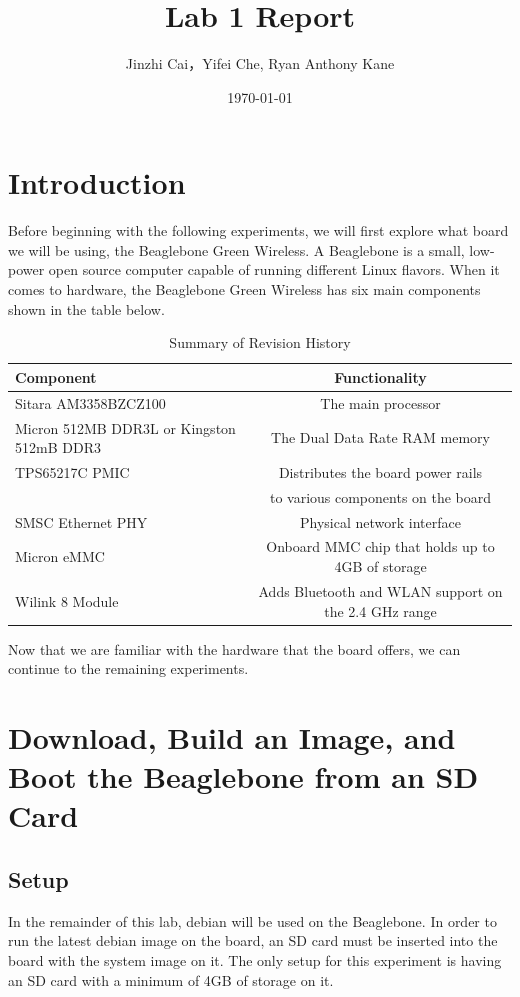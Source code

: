 \documentclass{article}
\title{Lab 1 Report}
\author{Jinzhi Cai，Yifei Che, Ryan Anthony Kane}
\date{\today}
\begin{document}
\maketitle
\newpage
\tableofcontents
\clearpage
\section{Introduction}
Before beginning with the following experiments, we will first explore what board we will be using, the Beaglebone Green Wireless. A Beaglebone is a small, low-power open source computer capable of running different Linux flavors. When it comes to hardware, the Beaglebone Green Wireless has six main components shown in the table below.
\begin{table}[H]
	\centering
	\begin{tabu}{l | c }
		Component                                 & Functionality                                        \\ \hline
		Sitara AM3358BZCZ100                      & The main processor                                   \\\hline
		Micron 512MB DDR3L or Kingston 512mB DDR3 & The Dual Data Rate RAM memory                        \\\hline
		TPS65217C PMIC                            & Distributes the board power rails                    \\
		                                          & to various components on the board                   \\\hline
		SMSC Ethernet PHY                         & Physical network interface                           \\\hline
		Micron eMMC                               & Onboard MMC chip that holds up to 4GB of storage     \\\hline
		Wilink 8 Module                           & Adds Bluetooth and WLAN support on the 2.4 GHz range
	\end{tabu}
	\caption{Summary of Revision History}
	\label{tab:rev}
\end{table}
Now that we are familiar with the hardware that the board offers, we can continue to the remaining experiments.
\clearpage
\section{Download, Build an Image, and Boot the Beaglebone from an SD Card}
\subsection{Setup}
In the remainder of this lab, debian will be used on the Beaglebone. In order to run the latest debian image on the board, an SD card must be inserted into the board with the system image on it. The only setup for this experiment is having an SD card with a minimum of 4GB of storage on it.
\end{document}
